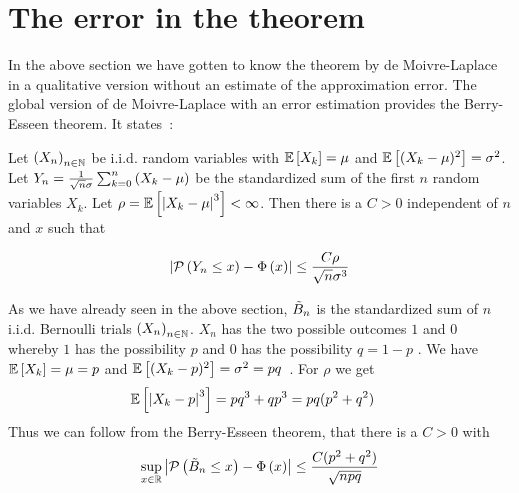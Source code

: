 \section{The error in the theorem}


In the above section we have gotten to know the theorem by de Moivre-Laplace in a qualitative version without an estimate of the approximation error. The global version of de Moivre-Laplace with an error estimation provides the Berry-Esseen theorem. It states~\cite[70-71]{nourdin}\cite{wiki:berry}:

\begin{theorem}
  Let $\left({X_n}\right)_{{n}\in\mathbb N}$ be i.i.d. random variables with $\mathbb E\left[{X_k}\right]=\mu$ and $\mathbb E\left[{(X_k-\mu)^2}\right]=\sigma^2$. Let $Y_n = \frac 1{\sqrt{n}\sigma} \sum_{k=0}^n \left( {X_k-\mu} \right)$ be the standardized sum of the first $n$ random variables $X_k$. Let $\rho = \mathbb E\left[{\left|{X_k-\mu}\right|^3}\right] < \infty$. Then there is a $C>0$ independent of $n$ and $x$ such that

  \begin{align}
    \left|{\mathcal P\left({Y_n \le x}\right) - \Phi\left( {x} \right)}\right| \le \frac{C \rho}{\sqrt n \sigma^3}
  \end{align}
\end{theorem}



As we have already seen in the above section, $\tilde B_{n}$ is the standardized sum of $n$ i.i.d. Bernoulli trials $\left({X_n}\right)_{{n}\in\mathbb N}$. $X_n$ has the two possible outcomes $1$ and $0$ whereby $1$ has the possibility $p$ and $0$ has the possibility $q=1-p$ \cite[p. 32]{georgii}\cite{wiki:bernoulli_distribution}. We have $\mathbb E\left[{X_k}\right] = \mu = p$ and $\mathbb E\left[{(X_k-p)^2}\right]=\sigma^2=pq$~\cite{wiki:bernoulli_distribution}\cite[p. 112]{georgii}. For $\rho$ we get
\begin{align}
  \mathbb E\left[{\left|{X_k-p}\right|^3}\right] &= p q^3 + q p^3 = pq (p^2+q^2)
\end{align}
Thus we can follow from the Berry-Esseen theorem, that there is a $C>0$ with
\begin{align}
  \sup_{x\in\mathbb R} \left|{\mathcal P\left({\tilde B_{n} \le x}\right)-\Phi\left( {x} \right)}\right| \le \frac{C(p^2+q^2)}{\sqrt{npq}}
\end{align}

